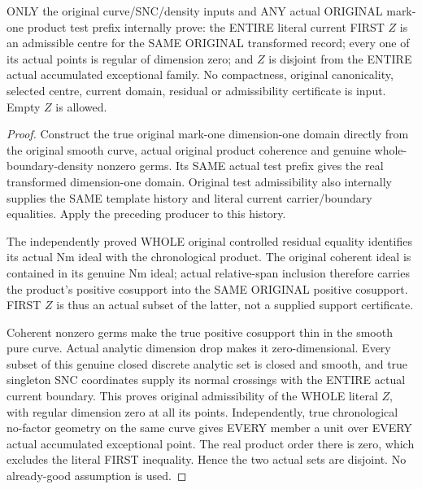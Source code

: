 \begin{theorem}
\label{hir:sharp-original-curve-whole-first-defect-original-admissible-centre}
\leanok
ONLY the original curve/SNC/density inputs and ANY actual ORIGINAL
mark-one product test prefix internally prove: the ENTIRE literal current
FIRST $Z$ is an admissible centre for the SAME ORIGINAL transformed
record; every one of its actual points is regular of dimension zero;
and $Z$ is disjoint from the ENTIRE actual accumulated exceptional family.
No compactness, original canonicality, selected centre, current domain,
residual or admissibility certificate is input. Empty $Z$ is allowed.
\end{theorem}
\begin{proof}
Construct the true original mark-one dimension-one domain directly from
the original smooth curve, actual original product coherence and genuine
whole-boundary-density nonzero germs. Its SAME actual test prefix gives
the real transformed dimension-one domain. Original test admissibility
also internally supplies the SAME template history and literal current
carrier/boundary equalities. Apply the preceding producer to this history.

The independently proved WHOLE original controlled residual equality
identifies its actual Nm ideal with the chronological product. The
original coherent ideal is contained in its genuine Nm ideal; actual
relative-span inclusion therefore carries the product's positive
cosupport into the SAME ORIGINAL positive cosupport. FIRST $Z$ is thus an
actual subset of the latter, not a supplied support certificate.

Coherent nonzero germs make the true positive cosupport thin in the
smooth pure curve. Actual analytic dimension drop makes it
zero-dimensional. Every subset of this genuine closed discrete analytic
set is closed and smooth, and true singleton SNC coordinates supply its
normal crossings with the ENTIRE actual current boundary. This proves
original admissibility of the WHOLE literal $Z$, with regular dimension
zero at all its points. Independently, true chronological no-factor
geometry on the same curve gives EVERY member a unit over EVERY actual
accumulated exceptional point. The real product order there is zero,
which excludes the literal FIRST inequality. Hence the two actual sets
are disjoint. No already-good assumption is used.
\end{proof}

